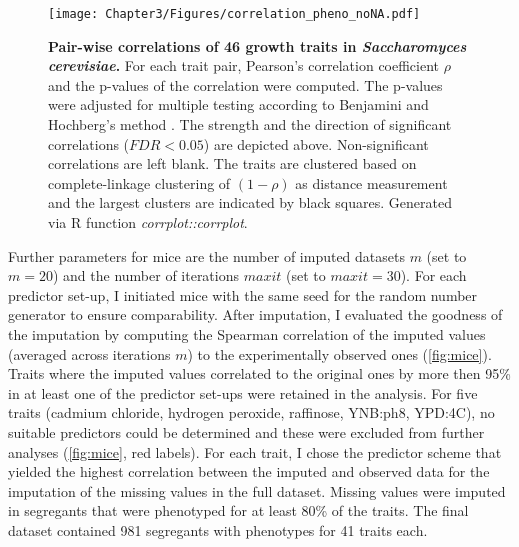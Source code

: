 \begin{figure}[hbtp]
	\centering
	\texttt{[image: Chapter3/Figures/correlation\_pheno\_noNA.pdf]}
	\caption[\textbf{Pairwise correlations of \num{46} growth traits in \emph{Saccharomyces cerevisiae}.}]{\textbf{Pair-wise correlations of \num{46} growth traits in \emph{Saccharomyces cerevisiae}.} For each trait pair, Pearson's correlation coefficient \(\rho\) and the p-values of the correlation were computed. The p-values were adjusted for multiple testing according to Benjamini and Hochberg's method \citep{Benjamini1995}. The strength and the direction of significant correlations (\(FDR < 0.05\)) are depicted above. Non-significant correlations are left blank. The traits are clustered based on complete-linkage clustering of \((1-\rho)\) as distance measurement and the largest clusters are indicated by black squares. Generated via R function \textit{corrplot::corrplot}.}
 	\label{fig:traitcorrelations}
\end{figure}


Further parameters for \gls{mice} are the number of imputed datasets \(m\) (set to \(m=20\)) and the number of iterations \(maxit\) (set to \(maxit=30\)). For each predictor set-up, I initiated \gls{mice} with the same seed for the random number generator to ensure comparability. After imputation, I evaluated the goodness of the imputation  by computing the Spearman correlation of the imputed values (averaged across iterations \(m\)) to the experimentally observed ones (\cref{fig:mice}). Traits where the imputed values correlated to the original ones by more then \num{95}\% in at least one of the predictor set-ups were retained in the analysis. For five traits (cadmium chloride, hydrogen peroxide, raffinose, YNB:ph8, YPD:4C), no suitable predictors could be determined and these were excluded from further analyses (\cref{fig:mice}, red labels). For each trait, I chose the predictor scheme that yielded the highest correlation between the imputed and observed data for the imputation of the missing values in the full dataset. Missing values were imputed in segregants that were phenotyped for at least \num{80}\% of the traits. The final dataset contained \num{981} segregants with phenotypes for \num{41} traits each. 
 	
